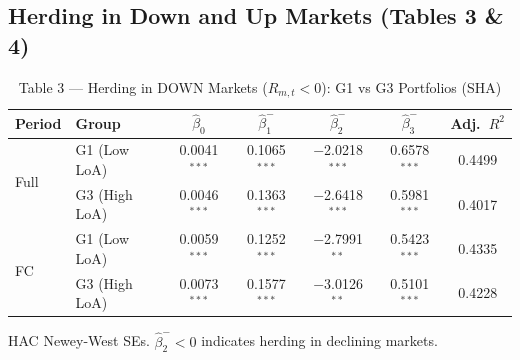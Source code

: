 \documentclass[12pt, a4paper]{article}
\begin{document}
\subsection{Herding in Down and Up Markets (Tables 3 \& 4)}

\begin{table}[H]
  \centering
  \caption{Table 3 — Herding in DOWN Markets ($R_{m,t} < 0$): G1 vs G3 Portfolios (SHA)}
  \label{tab:down_markets}
  \begin{threeparttable}
  \small
  \begin{tabular}{llccccc}
    \toprule
    Period & Group & $\hat\beta_0$ & $\hat\beta_1^{-}$ & $\hat\beta_2^{-}$ & $\hat\beta_3^{-}$ & Adj.~$R^2$ \\
    \midrule
    \multirow{2}{*}{Full}
      & G1 (Low LoA)  & 0.0041$^{***}$ &  0.1065$^{***}$ & $-$2.0218$^{***}$ & 0.6578$^{***}$ & 0.4499 \\
      & G3 (High LoA) & 0.0046$^{***}$ &  0.1363$^{***}$ & $-$2.6418$^{***}$ & 0.5981$^{***}$ & 0.4017 \\
    \midrule
    \multirow{2}{*}{FC}
      & G1 (Low LoA)  & 0.0059$^{***}$ &  0.1252$^{***}$ & $-$2.7991$^{**}$  & 0.5423$^{***}$ & 0.4335 \\
      & G3 (High LoA) & 0.0073$^{***}$ &  0.1577$^{***}$ & $-$3.0126$^{**}$  & 0.5101$^{***}$ & 0.4228 \\
    \bottomrule
  \end{tabular}
  \begin{tablenotes}
    \footnotesize
    \item HAC Newey-West SEs. $\hat\beta_2^{-} < 0$ indicates herding in declining markets.
  \end{tablenotes}
  \end{threeparttable}
\end{table}
\end{document}
